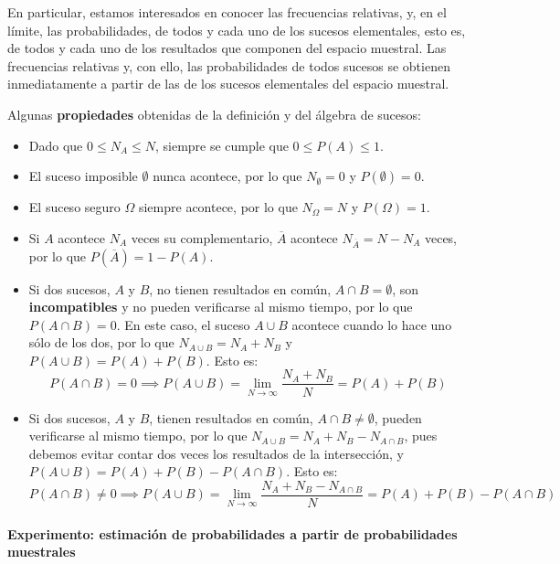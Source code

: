 \documentclass[11pt]{article}
\providecommand{\tightlist}{%
      \setlength{\itemsep}{0pt}\setlength{\parskip}{0pt}}
\begin{document}
En particular, estamos interesados en conocer las frecuencias relativas,
y, en el límite, las probabilidades, de todos y cada uno de los sucesos
elementales, esto es, de todos y cada uno de los resultados que componen
del espacio muestral. Las frecuencias relativas y, con ello, las
probabilidades de todos sucesos se obtienen inmediatamente a partir de
las de los sucesos elementales del espacio muestral.

    Algunas \textbf{propiedades} obtenidas de la definición y del álgebra de
sucesos:
\begin{itemize}
 \item Dado que \(0\leq N_A \leq N\), siempre se cumple que
\(0\leq P(A)\leq 1\). 
\item El suceso imposible \(\emptyset\) nunca
acontece, por lo que \(N_\emptyset = 0\) y \(P(\emptyset)=0\). 
\item El
suceso seguro \(\Omega\) siempre acontece, por lo que \(N_\Omega =N\) y
\(P(\Omega)=1\). 
\item Si \(A\) acontece \(N_A\) veces su complementario,
\(\overline A\) acontece \(N_{\overline A}=N-N_A\) veces, por lo que
\(P(\overline A)=1-P(A)\).
\end{itemize}

    \begin{itemize}
\tightlist
\item
  Si dos sucesos, \(A\) y \(B\), no tienen resultados en común,
  \(A\cap B =\emptyset\), son \textbf{incompatibles} y no pueden
  verificarse al mismo tiempo, por lo que \(P(A\cap B)=0\). En este
  caso, el suceso \(A\cup B\) acontece cuando lo hace uno sólo de los
  dos, por lo que \(N_{A\cup B}=N_A + N_B\) y \(P(A\cup B)=P(A)+P(B)\).
  Esto es:
  \[P(A\cap B)=0 \implies P(A\cup B) = \lim_{N\to \infty}\frac{N_A+N_B}{N}=P(A)+P(B)\]
\end{itemize}

    \begin{itemize}
\tightlist
\item
  Si dos sucesos, \(A\) y \(B\), tienen resultados en común,
  \(A\cap B \neq\emptyset\), pueden verificarse al mismo tiempo, por lo
  que \(N_{A\cup B}=N_A + N_B - N_{A\cap B}\), pues debemos evitar
  contar dos veces los resultados de la intersección, y
  \(P(A\cup B)=P(A)+P(B)-P(A\cap B)\). Esto es:
  \[P(A\cap B)\neq 0 \implies P(A\cup B) = \lim_{N\to \infty}\frac{N_A+N_B-N_{A\cap B}}{N}=P(A)+P(B)-P(A\cap B)\]
\end{itemize}

    \paragraph{Experimento: estimación de probabilidades a partir de
probabilidades
muestrales}\label{experimento-estimaciuxf3n-de-probabilidades-a-partir-de-probabilidades-muestrales}
\end{document}

